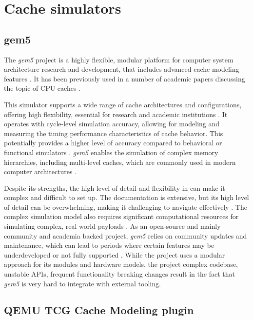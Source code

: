 \section{Cache simulators}

\subsection{gem5}

The \textit{gem5} project is a highly flexible, modular platform for computer system architecture research and development, that includes advanced cache modeling features \cite{gem5cachesupport}.
It has been previously used in a number of academic papers discussing the topic of CPU caches \cite{gem5cachecite1, gem5cachecite2, gem5cachecite3}.

This simulator supports a wide range of cache architectures and configurations, offering high flexibility, essential for research and academic institutions \cite{gem5}.
It operates with cycle-level simulation accuracy, allowing for modeling and measuring the timing performance characteristics of cache behavior. This potentially provides a higher level of accuracy
compared to behavioral or functional simulators \cite{gem5accuracy}. \textit{gem5} enables the simulation of complex memory hierarchies, including multi-level caches, which are commonly
used in modern computer architectures \cite{gem5multilevel, cachesimsurv}.

Despite its strengths, the high level of detail and flexibility in can make it complex and difficult to set up. The documentation is extensive, but its high level of detail can be overwhelming,
making it challenging to navigate effectively \cite{gem5hell}. The complex simulation model also requires significant computational resources for simulating complex, real world payloads
\cite{gem5, cachesimsurv}. As an open-source and mainly community and academia backed project, \textit{gem5} relies on community updates and maintenance, which can lead to periods where certain
features may be underdeveloped or not fully supported \cite{gem5hell, gem5maintainers}. While the project uses a modular approach for its modules and hardware models, the project complex codebase,
unstable APIs, frequent functionality breaking changes \cite{gem5hell} result in the fact that \textit{gem5} is very hard to integrate with external tooling.

\subsection{QEMU TCG Cache Modeling plugin} \label{sec:qemu_cache}

